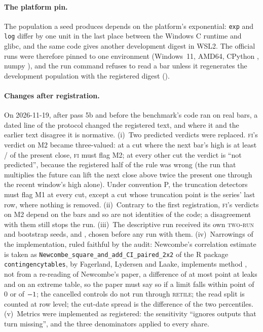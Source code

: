 \documentclass[11pt]{article}
\newcommand{\code}[1]{\texttt{#1}}
\newcommand{\FI}{\textsc{fi}}
\newcommand{\RT}{\textsc{retile}}
\newcommand{\TR}{\textsc{two-run}}
\begin{document}
\paragraph{The platform pin.} The population a seed produces depends on the platform's
exponential: \code{exp} and \code{log} differ by one unit in the last place between the Windows C
runtime and glibc, and the same code gives another development digest in WSL2. The official runs
were therefore pinned to one environment (Windows~11, AMD64, CPython \NumWaveCPython, numpy
\NumWaveNumpy), and the run command refuses to read a bar unless it regenerates the development
population with the registered digest (\NumDevDigest).

\paragraph{Changes after registration.}\label{sec:changes} On 2026-11-19, after pass 5b and before
the benchmark's code ran on real bars, a dated line of the protocol changed the registered text, and where it
and the earlier text disagree it is normative.
(i)~Two predicted verdicts were replaced. \FI's verdict on M2 became three-valued: at a cut where the
next bar's high is at least \NumMtwoNum/\NumMtwoDen{} of the present close, \FI{} must flag M2; at
every other cut the verdict is ``not predicted'', because the registered half of the rule was wrong
(the run that multiplies the future can lift the next close above twice the present one through the
recent window's high alone). Under convention P, the truncation detectors must flag M1 at every cut,
except a cut whose truncation point is the series' last row, where nothing is removed.
(ii)~Contrary to the first registration, \FI's verdicts on M2 depend on the bars and so are not
identities of the code; a disagreement with them still stops the run.
(iii)~The descriptive run received its own \TR{} and bootstrap seeds, \NumDescTwoRunSeed{} and
\NumDescBootSeed, chosen before any run with them.
(iv)~Narrowings of the implementation, ruled faithful by the audit: Newcombe's correlation estimate
is taken as \code{Newcombe\_square\_and\_add\_CI\_paired\_2x2} of the R package \code{contingencytables},
by Fagerland, Lydersen and Laake, implements method \NumNewcombeMethod, not from a re-reading of Newcombe's paper, a difference of at most \NumPsiDiff{} point at \NumPopN{} leaks and
\NumPsiDiffExtreme{} on an extreme table, so the paper must say so if a limit falls within
\NumPsiFlag{} point of 0 or of $-1$; the cancelled controls do not run through
\RT; the read split is counted at row level; the cut-date spread is the difference of the two
percentiles.
(v)~Metrics were implemented as registered: the sensitivity ``ignores outputs that turn missing'',
and the three denominators applied to every share.
\end{document}
